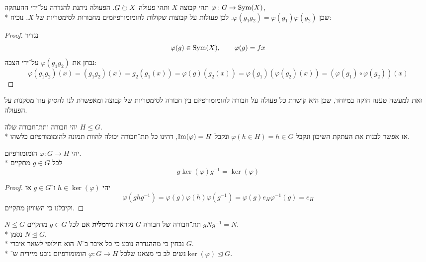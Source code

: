 \begin{example}
	תהי קבוצה $X$ ותהי פעולה $G \circlearrowright X$. הפעולה ניתנת להגדרה על־ידי ההעתקה $\varphi : G \to \operatorname{Sym}(X)$, \\*
	שכן $\varphi(g_1 g_2) = \varphi(g_1) \varphi(g_2)$.
	לכן פעולות על קבוצות שקולות להומומורפיזמים מחבורות לסימטריות של $X$.
	נוכיח:
	\begin{proof}
		נגדיר
		\[
			\varphi(g) \in \operatorname{Sym}(X),
			\qquad
			\varphi(g) = fx
		\]
		נבחן את $\varphi(g_1g_2)$ על־ידי הצבה:
		\[
			\varphi(g_1g_2)(x)
			= (g_1 g_2)(x)
			= g_2(g_1(x))
			= \varphi(g)(g_2(x))
			= \varphi(g_1)(\varphi(g_2)(x))
			= (\varphi(g_1) \circ \varphi(g_2))(x)
		\]
	\end{proof}
	זאת למעשה טענה חזקה במיוחד, שכן היא קושרת כל פעולה על חבורה להומומורפיזם בין חבורה לסימטריות של קבוצה ומאפשרת לנו להסיק עוד מסקנות על הפעולה.
\end{example}
\begin{example}[שיכון]
	יהי חבורה ותת־חבורה שלה $H \le G$. \\*
	אז אפשר לבנות את העתקת השיכון ונקבל $\varphi(h \in H) = h \in G$ ונקבל $\operatorname{Im}(\varphi) = H$, דהינו כל תת־חבורה יכולה להוות תמונה להומומורפיזם כלשהו.
\end{example}
\begin{proposition}
	יהי $\varphi : G \to H$ הומומורפיזם. \\*
	לכל $g \in G$ מתקיים
	\[
		g \ker(\varphi) g^{-1} = \ker(\varphi)
	\]
\end{proposition}
\begin{proof}
	יהי $h \in \ker(\varphi)$ ו־$g \in G$ אז
	\[
		\varphi(g h g^{-1}) = \varphi(g) \varphi(h) \varphi(g^{-1}) = \varphi(g) e_H \varphi^{-1}(g) = e_H
	\]
	וקיבלנו כי השוויון מתקיים.
\end{proof}

\begin{definition}
$N \le G$ תת־חבורה של חבורה $G$ נקראת \textbf{נורמלית} אם לכל $g \in G$ מתקיים $g N g^{-1} = N$. \\*
נסמן $N \trianglelefteq G$. \\*
נבחין כי מההגדרה נובע כי כל איבר ב־$N$ הוא חילופי לשאר איברי $G$. \\*
נשים לב כי מצאנו שלכל $\varphi : G \to H$ הומומורפיזם נובע מיידית ש־$\ker(\varphi) \trianglelefteq G$.
\end{definition}

